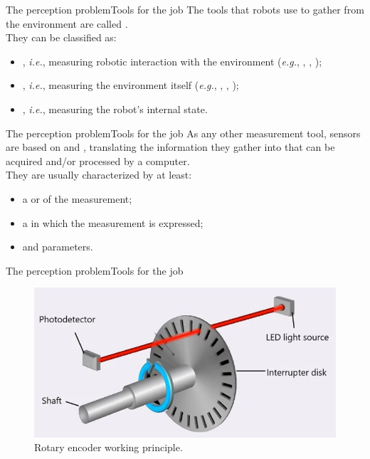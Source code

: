 \begin{frame}{The perception problem}{Tools for the job}
  The tools that robots use to gather  from the environment are called .\\
  \medskip
  They can be classified as:
  \begin{itemize}
    \item {}, \emph{i.e.}, measuring robotic interaction with the environment (\emph{e.g.}, , , );
    \item {}, \emph{i.e.}, measuring the environment itself (\emph{e.g.}, , , );
    \item {}, \emph{i.e.}, measuring the robot's internal state.
  \end{itemize}
\end{frame}
\begin{frame}{The perception problem}{Tools for the job}
  As any other measurement tool, sensors are based on  and , translating the information they gather into  that can be acquired and/or processed by a computer.\\
  \medskip
  They are usually characterized by at least:
  \begin{itemize}
    \item a  or   of the measurement;
    \item a  in which the measurement is expressed;
    \item {} and  parameters.
  \end{itemize}
\end{frame}
\begin{frame}{The perception problem}{Tools for the job}
  \begin{figure}
    \centering
    \includegraphics[width=.75\textwidth]{encoder.png}
    \caption{Rotary encoder working principle.}
    \label{fig:encoder}
  \end{figure}
\end{frame}
